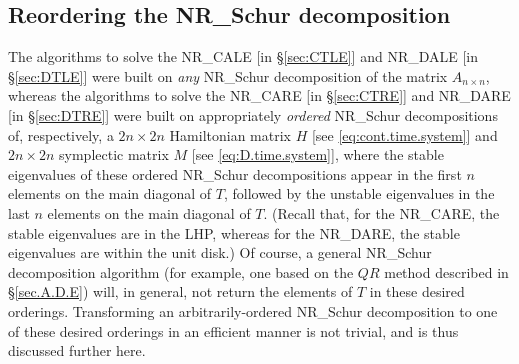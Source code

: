 \enlargethispage{7pt}
\subsection{Reordering the NR_Schur decomposition}\label{sec:ReorderedNR_Schur}

The algorithms to solve the NR_CALE [in \S \ref{sec:CTLE}] and NR_DALE [in \S \ref{sec:DTLE}] were built on {\it any} NR_Schur decomposition of
the matrix $A_{n\times n}$, whereas the algorithms to solve the NR_CARE [in \S \ref{sec:CTRE}] and NR_DARE [in \S \ref{sec:DTRE}] were built on appropriately {\it ordered} NR_Schur
decompositions of, respectively, a ${2n\times 2n}$ Hamiltonian matrix $H$ [see \eqref{eq:cont.time.system}] and ${2n\times 2n}$ symplectic matrix $M$ [see \eqref{eq:D.time.system}],
where the stable eigenvalues of these ordered NR_Schur decompositions appear in the first $n$ elements on the main diagonal of $T$, followed by the unstable eigenvalues in the last $n$
elements on the main diagonal of $T$.  (Recall that, for the NR_CARE, the stable eigenvalues are in the LHP, whereas for the NR_DARE, the stable eigenvalues are within the unit disk.)
Of course, a general NR_Schur decomposition algorithm (for example, one based on the $QR$ method described in \S \ref{sec.A.D.E})
will, in general, not return the elements of $T$ in these desired orderings.  Transforming an arbitrarily-ordered NR_Schur decomposition
to one of these desired orderings in an efficient manner is not trivial, and is thus discussed further here.

